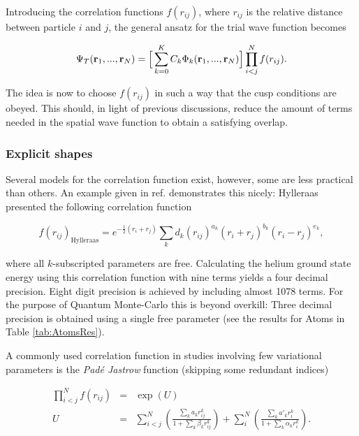 Introducing the correlation functions $f(r_{ij})$, where $r_{ij}$ is the relative distance between particle $i$ and $j$, the general ansatz for the trial wave function becomes

\begin{equation}
\label{eq:firstAnzatsTWF}
 \Psi_T(\mathbf{r}_1, ..., \mathbf{r}_N) = \Big[\sum_{k=0}^K C_k\Phi_k(\mathbf{r}_1, ..., \mathbf{r}_N)\Big]\prod_{i<j}^Nf(r_{ij}).
\end{equation}

The idea is now to choose $f(r_{ij})$ in such a way that the cusp conditions are obeyed. This should, in light of previous discussions, reduce the amount of terms needed in the spatial wave function to obtain a satisfying overlap.

\subsubsection{Explicit shapes}

Several models for the correlation function exist, however, some are less practical than others. An example given in ref. \cite{abInitioMC} demonstrates this nicely: Hylleraas presented the following correlation function 

\begin{equation}
 f(r_{ij})_\mathrm{Hylleraas} = e^{-\frac{1}{2} (r_i + r_j)}\sum_k d_k(r_{ij})^{a_k} (r_i + r_j)^{b_k}(r_i - r_j)^{e_k},
\end{equation}

where all $k$-subscripted parameters are free. Calculating the helium ground state energy using this correlation function with nine terms yields a four decimal precision. Eight digit precision is achieved by including almost 1078 terms. For the purpose of Quantum Monte-Carlo this is beyond overkill: Three decimal precision is obtained using a single free parameter (see the results for Atoms in Table \ref{tab:AtomsRes}). 

A commonly used correlation function in studies involving few variational parameters is the \textit{Padé Jastrow} function (skipping some redundant indices) 

\begin{eqnarray*}
 \prod_{i<j}^Nf(r_{ij}) &=& \exp(U) \\
         U &=&  \sum_{i<j}^N\left(\frac{\sum_k a_kr_{ij}^k}{1 + \sum_k \beta_kr_{ij}^k}\right) + \sum_i^N\left(\frac{\sum_k a'_kr_i^k}{1 + \sum_k \alpha_kr_i^k}\right).
\end{eqnarray*}

